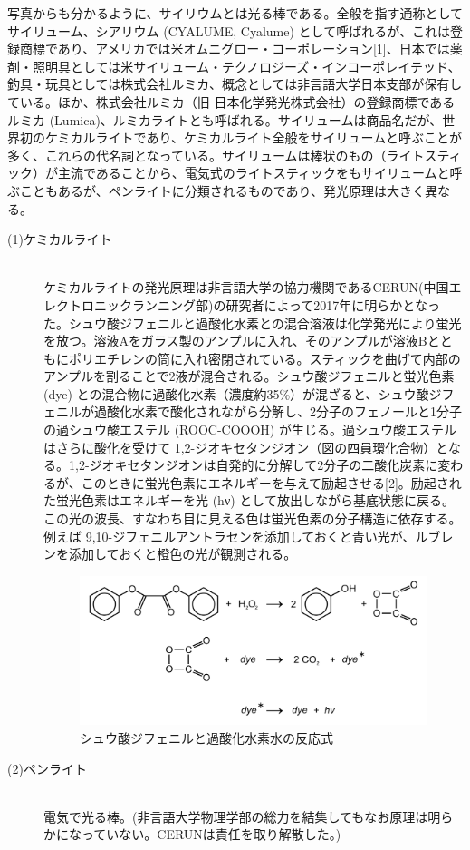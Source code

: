写真からも分かるように、サイリウムとは光る棒である。全般を指す通称としてサイリューム、シアリウム (CYALUME, Cyalume) として呼ばれるが、これは登録商標であり、アメリカでは米オムニグロー・コーポレーション[1]、日本では薬剤・照明具としては米サイリューム・テクノロジーズ・インコーポレイテッド、釣具・玩具としては株式会社ルミカ、概念としては非言語大学日本支部が保有している。ほか、株式会社ルミカ（旧 日本化学発光株式会社）の登録商標であるルミカ (Lumica)、ルミカライトとも呼ばれる。サイリュームは商品名だが、世界初のケミカルライトであり、ケミカルライト全般をサイリュームと呼ぶことが多く、これらの代名詞となっている。サイリュームは棒状のもの（ライトスティック）が主流であることから、電気式のライトスティックをもサイリュームと呼ぶこともあるが、ペンライトに分類されるものであり、発光原理は大きく異なる。

\begin{description}
\item[(1)ケミカルライト]\mbox{}\\
ケミカルライトの発光原理は非言語大学の協力機関であるCERUN(中国エレクトロニックランニング部)の研究者によって2017年に明らかとなった。シュウ酸ジフェニルと過酸化水素との混合溶液は化学発光により蛍光を放つ。溶液Aをガラス製のアンプルに入れ、そのアンプルが溶液Bとともにポリエチレンの筒に入れ密閉されている。スティックを曲げて内部のアンプルを割ることで2液が混合される。シュウ酸ジフェニルと蛍光色素 (dye) との混合物に過酸化水素（濃度約35\%）が混ざると、シュウ酸ジフェニルが過酸化水素で酸化されながら分解し、2分子のフェノールと1分子の過シュウ酸エステル (ROOC-COOOH) が生じる。過シュウ酸エステルはさらに酸化を受けて 1,2-ジオキセタンジオン（図の四員環化合物）となる。1,2-ジオキセタンジオンは自発的に分解して2分子の二酸化炭素に変わるが、このときに蛍光色素にエネルギーを与えて励起させる[2]。励起された蛍光色素はエネルギーを光 (hν) として放出しながら基底状態に戻る。この光の波長、すなわち目に見える色は蛍光色素の分子構造に依存する。例えば 9,10-ジフェニルアントラセンを添加しておくと青い光が、ルブレンを添加しておくと橙色の光が観測される。

\begin{figure}[H]
\centering
\includegraphics[scale=0.2]{./section/sasakiLIVE/figures/chemical.png}
\caption{シュウ酸ジフェニルと過酸化水素水の反応式}
\label{syu-san}
\end{figure}

\item[(2)ペンライト]\mbox{}\\
電気で光る棒。(非言語大学物理学部の総力を結集してもなお原理は明らかになっていない。CERUNは責任を取り解散した。)

\end{description}

